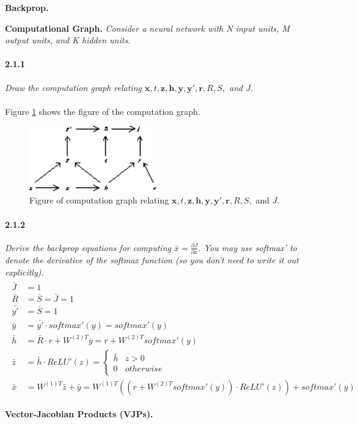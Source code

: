 \documentclass{myhw}
\begin{document}
\begin{homeworkProblem}
\textbf{Backprop.}
\begin{homeworkSection} \textbf{Computational Graph.} \emph{Consider a neural network with N input units, M output units, and K hidden units.} 
\paragraph{2.1.1} \emph{Draw the computation graph relating $\textbf{x}, t, \textbf{z}, \textbf{h}, \textbf{y}, \textbf{y}', \textbf{r}, R, S,$ and $J$.} \\
\\
Figure \ref{fig:q2.1} shows the figure of the computation graph.
\begin{figure}[ht]
  \centering
  \includegraphics[width=0.5\textwidth]{a2.eps} 
  \caption{Figure of computation graph relating $\textbf{x}, t, \textbf{z}, \textbf{h}, \textbf{y}, \textbf{y}', \textbf{r}, R, S,$ and $J$.}
  \label{fig:q2.1}
\end{figure}
\paragraph{2.1.2} \emph{Derive the backprop equations for computing $\bar{x} = \frac{\partial J}{\partial x}$. You may use softmax' to denote the derivative of the softmax function (so you don't need to write it out explicitly).} \\
\begin{gather*}
\begin{aligned}
\bar{J} &= 1 \\
\bar{R} &= \bar{S} = \bar{J} = 1 \\
\bar{y'} &= \bar{S} = 1 \\
\bar{y} &= \bar{y'} \cdot softmax'(y) = softmax'(y) \\
\bar{h} &= \bar{R} \cdot r + W^{(2)T} \bar{y} = r + W^{(2)T} softmax'(y) \\
\bar{z} &= \bar{h} \cdot ReLU'(z) = \begin{cases} \bar{h} &z>0 \\ 0 &otherwise \end{cases} \\
\bar{x} &= W^{(1)T} \bar{z} + \bar{y} = W^{(1)T} ( (r + W^{(2)T} softmax'(y)) \cdot ReLU'(z) ) + softmax'(y)
\end{aligned}
\end{gather*}
\end{homeworkSection}
\begin{homeworkSection} \textbf{Vector-Jacobian Products (VJPs).}

\end{homeworkSection}
\end{homeworkProblem}
\end{document}
